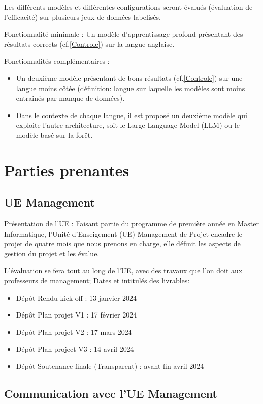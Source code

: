 \documentclass[11pt]{rapport_class}
\begin{document}
Les différents modèles et différentes configurations seront évalués (évaluation de l'efficacité) sur plusieurs jeux de données labelisés.

Fonctionnalité minimale : Un modèle d'apprentissage profond présentant des résultats corrects (cf.\ref{Controle}) sur la langue anglaise.

Fonctionnalités complémentaires :
\begin{itemize}
\item Un deuxième modèle présentant de bons résultats (cf.\ref{Controle}) sur une langue moins côtée (définition: langue sur laquelle les modèles sont moins entrainés par manque de données). 
\item Dans le contexte de chaque langue, il est proposé un deuxième modèle qui exploite l'autre architecture, soit le Large Language Model (LLM) ou le modèle basé sur la forêt.
\end{itemize}

\section{Parties prenantes}
\subsection{UE Management}
\qquad Présentation de l'UE : Faisant partie du programme de première année en Master Informatique, l'Unité d'Enseigement (UE) Management de Projet encadre le projet de quatre mois que nous prenons en charge, elle définit les aspects de gestion du projet et les évalue. 

L'évaluation se fera tout au long de l'UE, avec des travaux que l'on doit aux professeurs de management;
Dates et intitulés des livrables:
\begin{itemize}
    \item Dépôt Rendu kick-off  : 13 janvier 2024
    \item Dépôt Plan projet V1  : 17 février 2024
    \item Dépôt Plan projet V2  : 17 mars 2024
    \item Dépôt Plan project V3 : 14 avril 2024
    \item Dépôt Soutenance finale (Transparent) : avant fin avril 2024
\end{itemize}

\subsection{Communication avec l'UE Management} 
\end{document}
